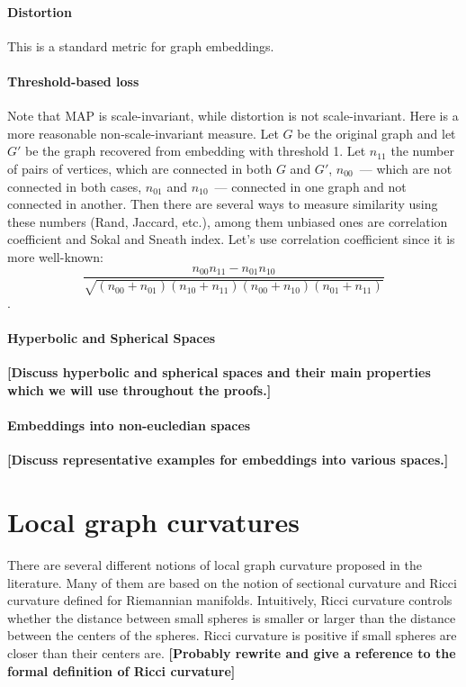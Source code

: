 \documentclass{article} %
\begin{document}
\paragraph{Distortion} This is a standard metric for graph embeddings.



\paragraph{Threshold-based loss}

Note that MAP is scale-invariant, while distortion is not scale-invariant. Here is a more reasonable non-scale-invariant measure. Let $G$ be the original graph and let $G'$ be the graph recovered from embedding with threshold 1.
Let $n_{11}$ the number of pairs of vertices, which are connected in both $G$ and $G'$, $n_{00}$~--- which are not connected in both cases, $n_{01}$ and $n_{10}$~--- connected in one graph and not connected in another. Then there are several ways to measure similarity using these numbers (Rand, Jaccard, etc.), among them unbiased ones are correlation coefficient and Sokal and Sneath index. Let's use correlation coefficient since it is more well-known: \[\frac{n_{00}n_{11} - n_{01}n_{10}}{\sqrt{(n_{00} + n_{01})(n_{10} + n_{11})(n_{00} + n_{10})(n_{01} + n_{11})}}\].

\fi

\paragraph{Hyperbolic and Spherical Spaces} \textbf{[Discuss hyperbolic and spherical spaces and their main properties which we will use throughout the proofs.]}

\paragraph{Embeddings into non-eucledian spaces} \textbf{[Discuss representative examples for embeddings into various spaces.]}

\section{Local graph curvatures}

There are several different notions of local graph curvature proposed in the literature. Many of them are based on the notion of sectional curvature and Ricci curvature defined for Riemannian manifolds. Intuitively, Ricci curvature controls whether the distance between small spheres is smaller or larger than the distance between the centers of the spheres. 
Ricci curvature is positive if
small spheres are closer than their centers are.
\textbf{[Probably rewrite and give a reference to the formal definition of Ricci curvature]}
\end{document}
